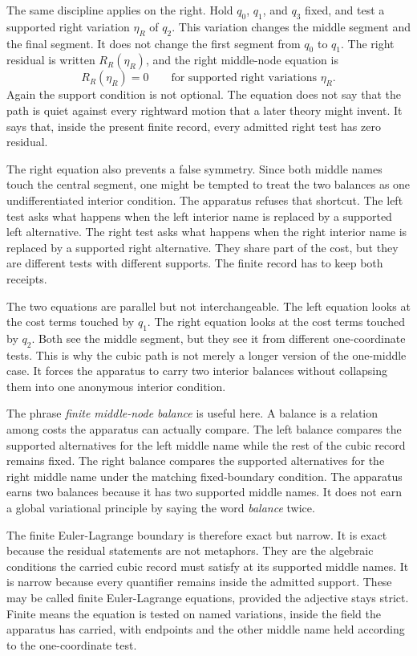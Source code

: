 The same discipline applies on the right. Hold \(q_0\), \(q_1\), and \(q_3\)
fixed, and test a supported right variation \(\eta_R\) of \(q_2\). This
variation changes the middle segment and the final segment. It does not
change the first segment from \(q_0\) to \(q_1\). The right residual is written
\(R_R(\eta_R)\), and the right middle-node equation is
\[
  R_R(\eta_R)=0
  \qquad \text{for supported right variations }\eta_R .
\]
Again the support condition is not optional. The equation does not say that
the path is quiet against every rightward motion that a later theory might
invent. It says that, inside the present finite record, every admitted right
test has zero residual.

The right equation also prevents a false symmetry. Since both middle names
touch the central segment, one might be tempted to treat the two balances as
one undifferentiated interior condition. The apparatus refuses that shortcut.
The left test asks what happens when the left interior name is replaced by a
supported left alternative. The right test asks what happens when the right
interior name is replaced by a supported right alternative. They share part of
the cost, but they are different tests with different supports. The finite
record has to keep both receipts.

The two equations are parallel but not interchangeable. The left equation
looks at the cost terms touched by \(q_1\). The right equation looks at the
cost terms touched by \(q_2\). Both see the middle segment, but they see it
from different one-coordinate tests. This is why the cubic path is not merely
a longer version of the one-middle case. It forces the apparatus to carry two
interior balances without collapsing them into one anonymous interior
condition.

The phrase \emph{finite middle-node balance} is useful here. A balance is a
relation among costs the apparatus can actually compare. The left balance
compares the supported alternatives for the left middle name while the rest of
the cubic record remains fixed. The right balance compares the supported
alternatives for the right middle name under the matching fixed-boundary
condition. The apparatus earns two balances because it has two supported
middle names. It does not earn a global variational principle by saying the word \emph{balance} twice.

The finite Euler-Lagrange boundary is therefore exact but narrow. It is exact
because the residual statements are not metaphors. They are the algebraic
conditions the carried cubic record must satisfy at its supported middle
names. It is narrow because every quantifier remains inside the admitted
support. These may be called finite Euler-Lagrange equations, provided the adjective stays strict. Finite means the equation is tested on named
variations, inside the field the apparatus has carried, with endpoints and the
other middle name held according to the one-coordinate test.

